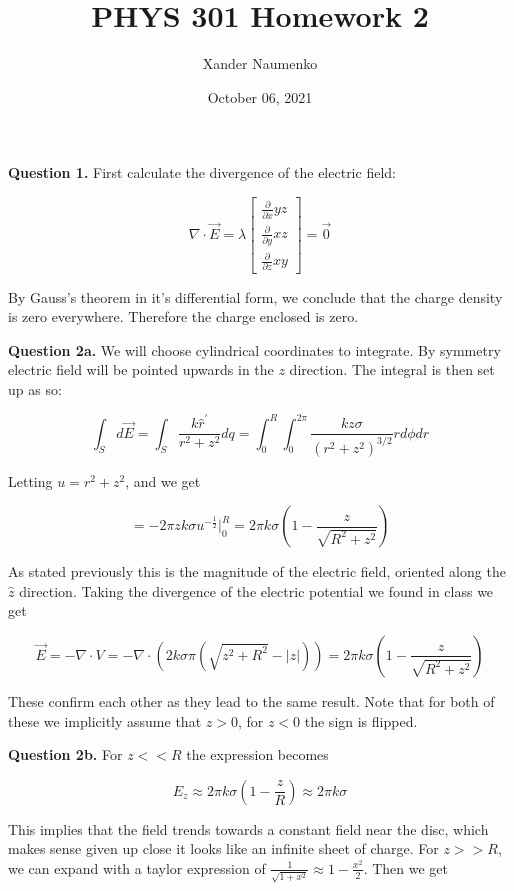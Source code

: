 \documentclass[letterpaper, reqno,11pt]{article}
\begin{document}
\title{PHYS 301 Homework 2}
\date{October 06, 2021}
\author{Xander Naumenko}
\maketitle

{\noindent\bf Question 1.} First calculate the divergence of the electric field: 

$$
    \nabla\cdot\vec E=\lambda\begin{bmatrix}
        \frac{\partial}{\partial x}yz\\
        \frac{\partial}{\partial y}xz\\
        \frac{\partial}{\partial z}xy
    \end{bmatrix}=\vec 0
$$

By Gauss's theorem in it's differential form, we conclude that the charge density is zero everywhere. Therefore the charge enclosed is zero. 

{\noindent\bf Question 2a.} We will choose cylindrical coordinates to integrate. By symmetry electric field will be pointed upwards in the $z$ direction. The integral is then set up as so: 

$$
    \int_S  d\vec E=\int_S \frac{k\hat r^\prime}{r^2+z^2}dq=\int_0^R\int_0^{2\pi}\frac{kz\sigma}{(r^2+z^2)^{3/2}}r  d\phi dr
$$

Letting $u=r^2+z^2$, and we get 

$$
    =-2\pi zk\sigma u^{-\frac12}\bigg|_0^R=2\pi k\sigma(1-\frac z{\sqrt{R^2+z^2}})
$$

As stated previously this is the magnitude of the electric field, oriented along the $\hat z$ direction. Taking the divergence of the electric potential we found in class we get 

$$
    \vec E=-\nabla\cdot V=-\nabla\cdot (2k\sigma\pi(\sqrt{z^2+R^2}-|z|))=2\pi k\sigma(1-\frac z{\sqrt{R^2+z^2}})
$$

These confirm each other as they lead to the same result. Note that for both of these we implicitly assume that $z>0$, for $z<0$ the sign is flipped. 

{\noindent\bf Question 2b.} For $z<<R$ the expression becomes 

$$
    E_z\approx2\pi k\sigma(1-\frac zR)\approx 2\pi k\sigma
$$

This implies that the field trends towards a constant field near the disc, which makes sense given up close it looks like an infinite sheet of charge. For $z>>R$, we can expand with a taylor expression of $\frac1{\sqrt{1+x^2}}\approx1-\frac{x^2}2$. Then we get 
\end{document}
